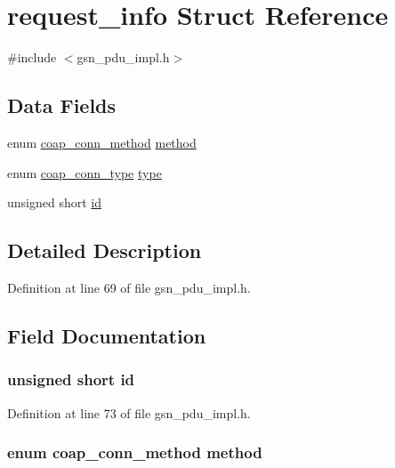 \hypertarget{a00456}{
\section{request\_\-info Struct Reference}
\label{a00456}
}


{\ttfamily \#include $<$gsn\_\-pdu\_\-impl.h$>$}

\subsection*{Data Fields}
\begin{DoxyCompactItemize}
\item 
enum \hyperlink{a00538_a60b3db981099ef05a78fd3a008890d4a}{coap\_\-conn\_\-method} \hyperlink{a00456_a082b4f8f68989edcecc0e9f24f219b12}{method}
\item 
enum \hyperlink{a00538_a4d3cbe1c9f1d4b500c83635a57a37d94}{coap\_\-conn\_\-type} \hyperlink{a00456_a0732b6df1426f35ef3677a29fbdb5786}{type}
\item 
unsigned short \hyperlink{a00456_a2e74aff868562e644e5d582929433363}{id}
\end{DoxyCompactItemize}


\subsection{Detailed Description}


Definition at line 69 of file gsn\_\-pdu\_\-impl.h.



\subsection{Field Documentation}
\hypertarget{a00456_a2e74aff868562e644e5d582929433363}{
\subsubsection[{id}]{\setlength{\rightskip}{0pt plus 5cm}unsigned short {\bf id}}}
\label{a00456_a2e74aff868562e644e5d582929433363}


Definition at line 73 of file gsn\_\-pdu\_\-impl.h.

\hypertarget{a00456_a082b4f8f68989edcecc0e9f24f219b12}{
\subsubsection[{method}]{\setlength{\rightskip}{0pt plus 5cm}enum {\bf coap\_\-conn\_\-method} {\bf method}}}
\label{a00456_a082b4f8f68989edcecc0e9f24f219b12}



